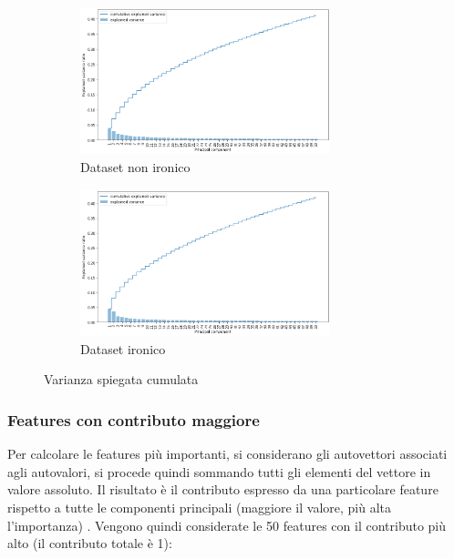 \documentclass[oneside]{book}
\begin{document}
\begin{figure}[H]
	\begin{subfigure}[H]{0.5 \textwidth}
		\centering
		\includegraphics[width=7.25cm]{assets/pca/non_ironic/cum-var.png}
		\caption{Dataset non ironico}
	\end{subfigure}
	\hfill
	\begin{subfigure}[H]{0.5 \textwidth}
		\centering
		\includegraphics[width=7.25cm]{assets/pca/ironic/cum-var.png}
		\caption{Dataset ironico}
	\end{subfigure}
	\caption{Varianza spiegata cumulata}
\end{figure}


\subsubsection{Features con contributo maggiore}
Per calcolare le features più importanti, si considerano gli autovettori associati agli autovalori, si procede quindi sommando tutti gli elementi del vettore in valore assoluto. Il risultato è il contributo espresso da una particolare feature rispetto a tutte le componenti principali (maggiore il valore, più alta l'importanza) \cite{pcaeigenvectors}. Vengono quindi considerate le 50 features con il contributo più alto (il contributo totale è 1):
\end{document}
